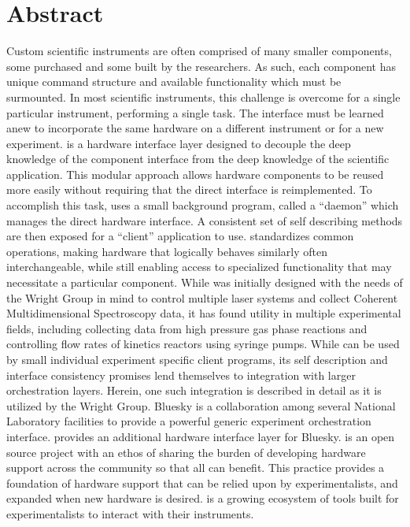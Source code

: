 
\chapter*{Abstract}


Custom scientific instruments are often comprised of many smaller components, some purchased and some built by the researchers.
As such, each component has unique command structure and available functionality which must be surmounted.
In most scientific instruments, this challenge is overcome for a single particular instrument, performing a single task.
The interface must be learned anew to incorporate the same hardware on a different instrument or for a new experiment.
\yaq{} is a hardware interface layer designed to decouple the deep knowledge of the component interface from the deep knowledge of the scientific application.
This modular approach allows hardware components to be reused more easily without requiring that the direct interface is reimplemented.
To accomplish this task, \yaq{} uses a small background program, called a ``daemon'' which manages the direct hardware interface.
A consistent set of self describing methods are then exposed for a ``client'' application to use.
\yaq{} standardizes common operations, making hardware that logically behaves similarly often interchangeable, while still enabling access to specialized functionality that may necessitate a particular component.
While \yaq{} was initially designed with the needs of the Wright Group in mind to control multiple laser systems and collect Coherent Multidimensional Spectroscopy data, it has found utility in multiple experimental fields, including collecting data from high pressure gas phase reactions and controlling flow rates of kinetics reactors using syringe pumps.
While \yaq{} can be used by small individual experiment specific client programs, its self description and interface consistency promises lend themselves to integration with larger orchestration layers.
Herein, one such integration is described in detail as it is utilized by the Wright Group.
Bluesky is a collaboration among several National Laboratory facilities to provide a powerful generic experiment orchestration interface.
\yaq{} provides an additional hardware interface layer for Bluesky.
\yaq{} is an open source project with an ethos of sharing the burden of developing hardware support across the community so that all can benefit.
This practice provides a foundation of \yaq{} hardware support that can be relied upon by experimentalists, and expanded when new hardware is desired.
\yaq{} is a growing ecosystem of tools built for experimentalists to interact with their instruments.
